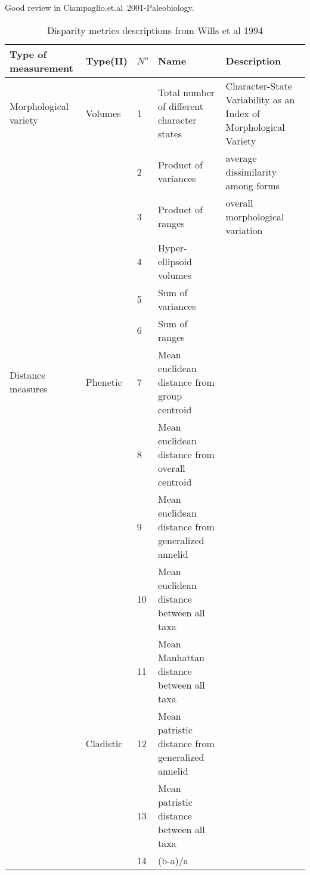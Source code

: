 \documentclass[12pt,letterpaper]{article}
\begin{document}
Good review in Ciampaglio.et.al~2001-Paleobiology.

\begin{landscape}
\begin{table}[H]
\caption{Disparity metrics descriptions from Wills et al 1994}
\centering
\begin{tabular}{p{4.5cm}p{2cm}p{1cm}p{10cm}p{6cm}}
  \hline
    Type of measurement & Type(II) & $N^o$ & Name & Description \\ %
  \hline
  Morphological variety & Volumes   & 1  & Total number of different character states       & Character-State Variability as an Index of Morphological Variety \\
                        &           & 2  & Product of variances                             & average dissimilarity among forms \\
                        &           & 3  & Product of ranges                                & overall morphological variation\\
                        &           & 4  & Hyper-ellipsoid volumes                          & \\
                        &           & 5  & Sum of variances                                 & \\
                        &           & 6  & Sum of ranges                                    & \\
  Distance measures     & Phenetic  & 7  & Mean euclidean distance from group centroid      & \\
                        &           & 8  & Mean euclidean distance from overall centroid    & \\
                        &           & 9  & Mean euclidean distance from generalized annelid & \\
                        &           & 10 & Mean euclidean distance between all taxa         & \\
                        &           & 11 & Mean Manhattan distance between all taxa         & \\
                        & Cladistic & 12 & Mean patristic distance from generalized annelid & \\
                        &           & 13 & Mean patristic distance between all taxa         & \\  
                        &           & 14 & (b-a)/a                                          & \\                          
  \hline
\end{tabular}
\end{table}
\end{landscape}
\end{document}
